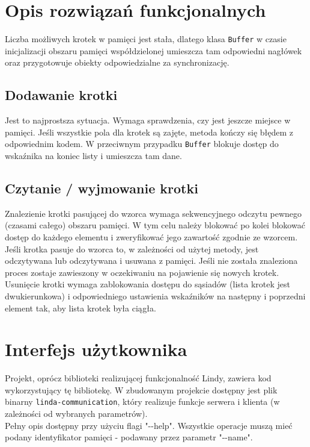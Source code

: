 \documentclass[a4paper]{article}
\begin{document}
	\section{Opis rozwiązań funkcjonalnych}
	Liczba możliwych krotek w pamięci jest stała, dlatego klasa \texttt{Buffer} w czasie inicjalizacji obszaru pamięci współdzielonej umieszcza tam odpowiedni nagłówek oraz przygotowuje obiekty odpowiedzialne za synchronizację.
	
	\subsection{Dodawanie krotki}
	Jest to najprostsza sytuacja. Wymaga sprawdzenia, czy jest jeszcze miejsce w pamięci.
	Jeśli wszystkie pola dla krotek są zajęte, metoda kończy się błędem z odpowiednim kodem.
	W przeciwnym przypadku \texttt{Buffer} blokuje dostęp do wskaźnika na koniec listy i umieszcza tam dane.
	
	\subsection{Czytanie / wyjmowanie krotki}
	Znalezienie krotki pasującej do wzorca wymaga sekwencyjnego odczytu pewnego (czasami całego) obszaru pamięci.
	W tym celu należy blokować po kolei blokować dostęp do każdego elementu i zweryfikować jego zawartość zgodnie ze wzorcem.
	Jeśli krotka pasuje do wzorca to, w zależności od użytej metody, jest odczytywana lub odczytywana i usuwana z pamięci.
	Jeśli nie została znaleziona proces zostaje zawieszony w oczekiwaniu na pojawienie się nowych krotek.
	Usunięcie krotki wymaga zablokowania dostępu do sąsiadów (lista krotek jest dwukierunkowa) i odpowiedniego ustawienia wskaźników na następny i poprzedni element tak, aby lista krotek była ciągła. 
		
	\section{Interfejs użytkownika}
	Projekt, oprócz biblioteki realizującej funkcjonalność Lindy, zawiera kod wykorzystujący tę bibliotekę. W zbudowanym projekcie dostępny jest plik binarny \texttt{linda-communication}, który realizuje funkcje serwera i klienta (w zależności od wybranych parametrów).
	\\
	Pełny opis dostępny przy użyciu flagi "-{}-help". Wszystkie operacje muszą mieć podany identyfikator pamięci - podawany przez parametr "-{}-name". \\
	
\end{document}

